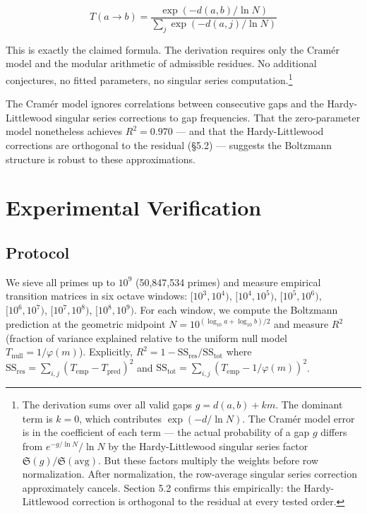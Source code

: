 \documentclass[
  11pt,
]{article}
\newcounter{none} %
\begin{document}
\[T(a \to b) = \frac{\exp(-d(a,b)/\ln N)}{\sum_j \exp(-d(a,j)/\ln N)}\]

This is exactly the claimed formula. The derivation requires only the
Cramér model and the modular arithmetic of admissible residues. No
additional conjectures, no fitted parameters, no singular series
computation.\footnote{The derivation sums over all valid gaps
  \(g = d(a,b) + km\). The dominant term is \(k = 0\), which contributes
  \(\exp(-d/\ln N)\). The Cramér model error is in the coefficient of
  each term --- the actual probability of a gap \(g\) differs from
  \(e^{-g/\ln N}/\ln N\) by the Hardy-Littlewood singular series factor
  \(\mathfrak{S}(g)/\mathfrak{S}(\text{avg})\). But these factors
  multiply the weights before row normalization. After normalization,
  the row-average singular series correction approximately cancels.
  Section 5.2 confirms this empirically: the Hardy-Littlewood correction
  is orthogonal to the residual at every tested order.}

The Cramér model ignores correlations between consecutive gaps and the
Hardy-Littlewood singular series corrections to gap frequencies. That
the zero-parameter model nonetheless achieves \(R^2 = 0.970\) --- and
that the Hardy-Littlewood corrections are orthogonal to the residual
(§5.2) --- suggests the Boltzmann structure is robust to these
approximations.

\section{Experimental Verification}\label{sec:verification}

\subsection{Protocol}\label{sec:protocol}

We sieve all primes up to \(10^9\) (50,847,534 primes) and measure
empirical transition matrices in six octave windows: \([10^3, 10^4)\),
\([10^4, 10^5)\), \([10^5, 10^6)\), \([10^6, 10^7)\), \([10^7, 10^8)\),
\([10^8, 10^9)\). For each window, we compute the Boltzmann prediction
at the geometric midpoint \(N = 10^{(\log_{10} a + \log_{10} b)/2}\) and
measure \(R^2\) (fraction of variance explained relative to the uniform
null model \(T_{\text{null}} = 1/\varphi(m)\)). Explicitly,
\(R^2 = 1 - \text{SS}_{\text{res}} / \text{SS}_{\text{tot}}\) where
\(\text{SS}_{\text{res}} = \sum_{i,j}(T_{\text{emp}} - T_{\text{pred}})^2\)
and
\(\text{SS}_{\text{tot}} = \sum_{i,j}(T_{\text{emp}} - 1/\varphi(m))^2\).
\end{document}
